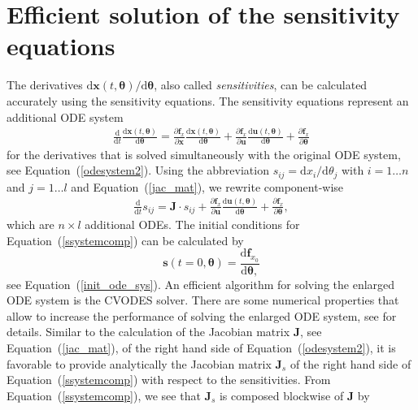 \documentclass[12pt,a4paper]{scrartcl}
\newcommand{\dd}[2]{\frac{\partial #1}{\partial #2}}
\newcommand{\DD}[2]{\frac{\mathrm{d} #1}{\mathrm{d} #2}}
\begin{document}
\section{Efficient solution of the sensitivity equations} \label{sec:ode_simu}
The derivatives $\mathrm{d}\mathbf{x}(t,\boldsymbol{\theta}) / \mathrm{d} \boldsymbol{\theta}$, also called 
\emph{sensitivities}, can be calculated accurately using the sensitivity equations. The 
sensitivity equations represent an additional ODE system
\begin{eqnarray}
	\DD{}{t} \DD{\mathbf{x}(t,\boldsymbol{\theta})}{\boldsymbol{\theta}}  =  \dd{\mathbf{f}
_x}{\mathbf{x}}  \DD{\mathbf{x}(t,\boldsymbol{\theta})}{\boldsymbol{\theta}} +  
\dd{\mathbf{f}_x}{\mathbf{u}}  \DD{\mathbf{u}(t,\boldsymbol{\theta})}{\boldsymbol{\theta}} + 
\dd{\mathbf{f}_x}{\boldsymbol{\theta}} \label{ssystem2}
\end{eqnarray}
for the derivatives \citep{Leis:1988dl} that is solved simultaneously with the original ODE 
system, see Equation~(\ref{odesystem2}). Using the abbreviation $s_{ij} = \mathrm{d} x_i / \mathrm{d} \theta_j
$ with $i = 1 \dots n$ and $j = 1 \dots l$ and Equation~(\ref{jac_mat}), we rewrite 
component-wise
\begin{eqnarray}
	\DD{}{t} s_{ij}  =  \mathbf{J} \cdot s_{ij} +  \dd{\mathbf{f}_x}{\mathbf{u}}  
\DD{\mathbf{u}(t,\boldsymbol{\theta})}{\boldsymbol{\theta}} + \dd{\mathbf{f}_x}
{\boldsymbol{\theta}}, \label{ssystemcomp}
\end{eqnarray}
which are $n \times l$ additional ODEs. The initial conditions for 
Equation~(\ref{ssystemcomp}) can be calculated by 
\begin{equation}
	\mathbf{s}(t=0,\boldsymbol{\theta}) = \DD{\mathbf{f}_{x_0}}{\boldsymbol{\theta},}
\end{equation}
see Equation~(\ref{init_ode_sys}). An efficient algorithm for solving the enlarged ODE 
system is the CVODES solver. There are some numerical properties that allow to increase 
the performance of solving the enlarged ODE system, see \cite{Hindmarsh:2005fb} for 
details. Similar to the calculation of the Jacobian matrix $\mathbf{J}$, see 
Equation~(\ref{jac_mat}), of the right hand side of Equation~(\ref{odesystem2}), it is 
favorable to provide analytically the Jacobian matrix $\mathbf{J}_s$ of the right hand side 
of Equation~(\ref{ssystemcomp}) with respect to the sensitivities. From 
Equation~(\ref{ssystemcomp}), we see that $\mathbf{J}_s$ is composed blockwise of $
\mathbf{J}$ by
\end{document}
